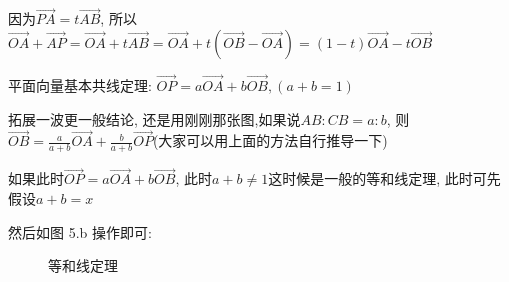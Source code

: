 \documentclass{book}
\begin{document}
    因为$\overrightarrow{PA}=t\overrightarrow{AB}$, 所以$\overrightarrow{OA}+\overrightarrow{AP}=\overrightarrow{OA}+t\overrightarrow{AB}=\overrightarrow{OA}+t(\overrightarrow{OB}-\overrightarrow{OA})=(1-t)\overrightarrow{OA}-t\overrightarrow{OB}$

    \textcolor[rgb]{0.38,0.11,0.2}{平面向量基本共线定理}: $\overrightarrow{OP}=a\overrightarrow{OA}+b\overrightarrow{OB},(a+b=1)$

    拓展一波更一般结论, 还是用刚刚那张图,如果说$AB:CB=a:b$, 则$\displaystyle \overrightarrow{OB}=\frac{a}{a+b}\overrightarrow{OA}+\frac{b}{a+b}\overrightarrow{OP}$(大家可以用上面的方法自行推导一下)

    如果此时$\overrightarrow{OP}=a\overrightarrow{OA}+b\overrightarrow{OB}$, 此时$a+b\neq 1$这时候是一般的\textcolor[rgb]{0.38,0.11,0.2}{等和线定理}, 此时可先假设$a+b=x$

    然后如图 5.b 操作即可:
    \begin{figure}[htbp]    %
          \centering            %
          \caption{等和线定理}    %
          \label{fig:subfig_1}            %
        \end{figure}
\end{document}
